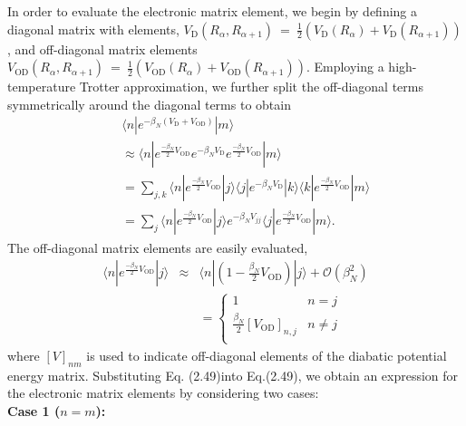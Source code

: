 \documentclass[phd,tocprelim]{cornell}
\begin{document}
In order to evaluate the electronic
matrix element, we begin by defining 
a diagonal matrix with elements, 
$V_\textrm{D}\left(R_\alpha,R_{\alpha+1}
\right)~=~\frac{1}{2}(V_\textrm{D}(R_{\alpha}) +
V_\textrm{D}(R_{\alpha+1}))$, and off-diagonal 
matrix elements 
$V_{\textrm{OD}}\left( R_\alpha, R_{\alpha+1} 
\right)~=~\frac{1}{2}(V_{\textrm{OD}}(R_{\alpha}) +
V_{\textrm{OD}}(R_{\alpha+1}))$.
Employing a high-temperature Trotter approximation,
we further split the off-diagonal terms symmetrically
around the diagonal terms to obtain
\begin{eqnarray}
\label{eq:elec_mat}
&&\langle n |
e^{-\beta_N (V_{\textrm{D}} + V_{\textrm{OD}})} |
m\rangle \\
\nonumber
&&\approx
 \langle n |
e^{\frac{-\beta_N}{2} V_{\textrm{OD}}}e^{-\beta_N
V_{\textrm{D}}} e^{\frac{-\beta_N}{2} V_{\textrm{OD}}} |
m\rangle \\
\nonumber
&&=\sum_{j,k}\langle n |
e^{\frac{-\beta_N}{2} V_{\textrm{OD}}}|j\rangle
\langle j| e^{-\beta_N
V_{\textrm{D}}}|k\rangle 
\langle k|
e^{\frac{-\beta_N}{2} V_{\textrm{OD}}}
|m\rangle \\
\nonumber
&& =\sum_{j}\langle n |
e^{\frac{-\beta_N}{2} V_{\textrm{OD}}}|j\rangle
e^{-\beta_N V_{j j}} \langle j|
e^{\frac{-\beta_N}{2} V_{\textrm{OD}}}
|m\rangle.
 \end{eqnarray}
The off-diagonal matrix elements are 
easily evaluated,
\begin{eqnarray} \label{eq:htapprox}
    \nonumber
\langle n |
e^{\frac{-\beta_N}{2} V_{\textrm{OD}}}|j\rangle
&\approx& \langle n |
(1-\frac{\beta_N}{2} V_{\textrm{OD}}) |j\rangle +
\mathcal{O}(\beta_N^2)\\
&& = \left\{ \begin{array}{cc}
1 & n=j\\
\frac{\beta_N}{2} \left[V_\textrm{OD}\right]_{n,j} & 
        n\neq j \\
    \end{array}\right.
\end{eqnarray}
where $\left[ V \right]_{nm}$ is used to indicate
off-diagonal elements of the diabatic potential energy 
matrix.
Substituting Eq. (2.49)into 
Eq.(2.49), we obtain an expression
for the electronic matrix elements by considering
two cases:\\

\noindent
{\bf Case 1 ($n=m$):}\\
\end{document}
